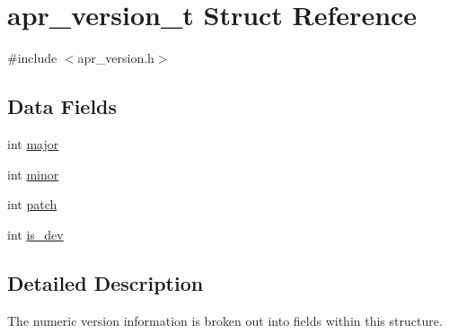 \hypertarget{structapr__version__t}{\section{apr\-\_\-version\-\_\-t Struct Reference}
\label{structapr__version__t}
}


{\ttfamily \#include $<$apr\-\_\-version.\-h$>$}

\subsection*{Data Fields}
\begin{DoxyCompactItemize}
\item 
int \hyperlink{structapr__version__t_a0ae64fee85387834ab76d9f9288373ab}{major}
\item 
int \hyperlink{structapr__version__t_aab0a1e8362517416389631bceeeedbad}{minor}
\item 
int \hyperlink{structapr__version__t_a98a629a88e776642d6e527d7535e0791}{patch}
\item 
int \hyperlink{structapr__version__t_aadc878af1010faa53e365e1142c81ced}{is\-\_\-dev}
\end{DoxyCompactItemize}


\subsection{Detailed Description}
The numeric version information is broken out into fields within this structure. 

